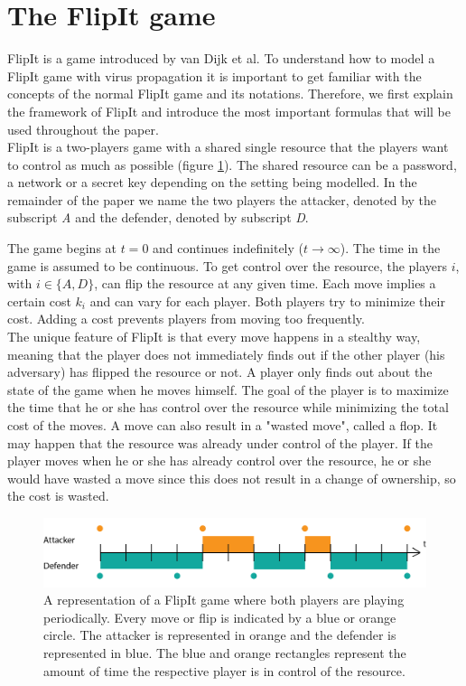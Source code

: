 \section{The FlipIt game}
\label{cha1:FlipItGame}
FlipIt is a game introduced by van Dijk et al. To understand how to model a FlipIt game with virus propagation it is important to get familiar with the concepts of the normal FlipIt game and its notations.  Therefore, we first explain the framework of FlipIt and introduce the most important formulas that will be used throughout the paper. \\

FlipIt is a two-players game with a shared single resource that the players want to control as much as possible (figure \ref{fig:FLipItDefault}). The shared resource can be a password, a network or a secret key depending on the setting being modelled. In the remainder of the paper we name the two players the attacker, denoted by the subscript \textit{A} and the defender, denoted by subscript \textit{D}. 

The game begins at $t=0$ and continues indefinitely ($t \rightarrow \infty $). The time in the game is assumed to be continuous. To get control over the resource, the players $i$, with $i \in \{A,D\}$, can flip the resource at any given time. 
Each move implies a certain cost $k_{i}$ and can vary for each player. Both players try to minimize their cost. Adding a cost prevents players from moving too frequently. \\

The unique feature of FlipIt is that every move happens in a stealthy way, meaning that the player does not immediately finds out if the other player (his adversary) has flipped the resource or not. A player only finds out about the state of the game when he moves himself. The goal of the player is to maximize the time that he or she has control over the resource while minimizing the total cost of the moves. A move can also result in a "wasted move", called a flop. It may happen that the resource was already under control of the player. If the player moves when he or she has already control over the resource, he or she would have wasted a move since this does not result in a change of ownership, so the cost is wasted. \\


\begin{figure}[hbtp]
\centering
\includegraphics[scale=0.7]{../../doc/template/Images/DefFlipItt.png}
\caption{A representation of a FlipIt game where both players are playing periodically. Every move or flip is indicated by a blue or orange circle. The attacker is represented in orange and the defender is represented in blue. The blue and orange rectangles represent the amount of time the respective player is in control of the resource.}
\label{fig:FLipItDefault}
\end{figure}



